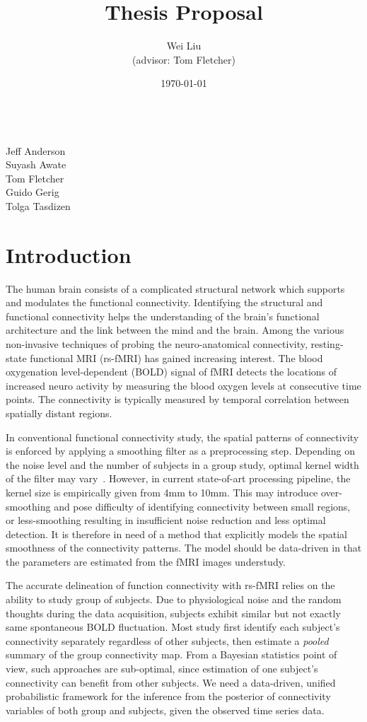 \documentclass[12pt]{article}
\begin{document}
\title{Thesis Proposal}
\author{Wei Liu\\ \small{(advisor: Tom Fletcher)} }
\date{\today} 

\maketitle 
\begin{center}
\\
Jeff Anderson \\
Suyash Awate \\
Tom Fletcher\\
Guido Gerig\\
Tolga Tasdizen
\end{center}

\section{Introduction}
The human brain consists of a complicated structural network which supports and
modulates the functional connectivity. Identifying the structural and functional
connectivity helps the understanding of the brain's functional architecture and
the link between the mind and the brain. Among the various non-invasive
techniques of probing the neuro-anatomical connectivity, resting-state
functional MRI (rs-fMRI) has gained increasing interest. The blood oxygenation
level-dependent (BOLD) signal of fMRI detects the locations of increased neuro
activity by measuring the blood oxygen levels at consecutive time points. The
connectivity is typically measured by temporal correlation between spatially
distant regions.

In conventional functional connectivity study, the spatial patterns of
connectivity is enforced by applying a smoothing filter as a preprocessing
step. Depending on the noise level and the number of subjects in a group study,
optimal kernel width of the filter may vary~\cite{mikl2008effects}. However, in
current state-of-art processing pipeline, the kernel size is empirically given
from 4mm to 10mm. This may introduce over-smoothing and pose difficulty of
identifying connectivity between small regions, or less-smoothing resulting in
insufficient noise reduction and less optimal detection. It is therefore in need
of a method that explicitly models the spatial smoothness of the connectivity
patterns. The model should be data-driven in that the parameters are estimated
from the fMRI images understudy.

The accurate delineation of function connectivity with rs-fMRI relies on the
ability to study group of subjects. Due to physiological noise and the random
thoughts during the data acquisition, subjects exhibit similar but not exactly
same spontaneous BOLD fluctuation. Most study first identify each subject's
connectivity separately regardless of other subjects, then estimate a
\emph{pooled} summary of the group connectivity map. From a Bayesian statistics
point of view, such approaches are sub-optimal, since estimation of one
subject's connectivity can benefit from other subjects. We need a data-driven,
unified probabilistic framework for the inference from the posterior of
connectivity variables of both group and subjects, given the observed time
series data.
\end{document}
